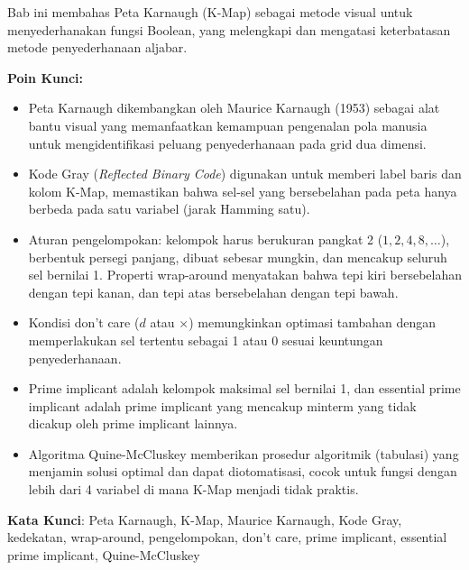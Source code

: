 \documentclass[../main]{subfiles}
\begin{document}
\begin{rangkuman}
Bab ini membahas Peta Karnaugh (K-Map) sebagai metode visual untuk menyederhanakan fungsi Boolean, yang melengkapi dan mengatasi keterbatasan metode penyederhanaan aljabar.

\textbf{Poin Kunci:}
\begin{itemize}
  \item Peta Karnaugh dikembangkan oleh Maurice Karnaugh (1953) sebagai alat bantu visual yang memanfaatkan kemampuan pengenalan pola manusia untuk mengidentifikasi peluang penyederhanaan pada grid dua dimensi.
  \item Kode Gray (\textit{Reflected Binary Code}) digunakan untuk memberi label baris dan kolom K-Map, memastikan bahwa sel-sel yang bersebelahan pada peta hanya berbeda pada satu variabel (jarak Hamming satu).
  \item Aturan pengelompokan: kelompok harus berukuran pangkat 2 ($1, 2, 4, 8, \ldots$), berbentuk persegi panjang, dibuat sebesar mungkin, dan mencakup seluruh sel bernilai 1. Properti wrap-around menyatakan bahwa tepi kiri bersebelahan dengan tepi kanan, dan tepi atas bersebelahan dengan tepi bawah.
  \item Kondisi don't care ($d$ atau $\times$) memungkinkan optimasi tambahan dengan memperlakukan sel tertentu sebagai 1 atau 0 sesuai keuntungan penyederhanaan.
  \item Prime implicant adalah kelompok maksimal sel bernilai 1, dan essential prime implicant adalah prime implicant yang mencakup minterm yang tidak dicakup oleh prime implicant lainnya.
  \item Algoritma Quine-McCluskey memberikan prosedur algoritmik (tabulasi) yang menjamin solusi optimal dan dapat diotomatisasi, cocok untuk fungsi dengan lebih dari 4 variabel di mana K-Map menjadi tidak praktis.
\end{itemize}

\textbf{Kata Kunci}: Peta Karnaugh, K-Map, Maurice Karnaugh, Kode Gray, kedekatan, wrap-around, pengelompokan, don't care, prime implicant, essential prime implicant, Quine-McCluskey
\end{rangkuman}

\ifSubfilesClassLoaded{
  \renewcommand{\bibname}{Daftar Pustaka}
  
  
}{}
\end{document}
